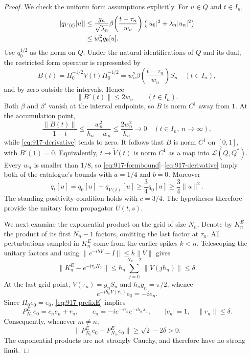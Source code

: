 \documentclass[11pt,a4paper]{article}
\theoremstyle{remark}
\begin{document}
\begin{proof}
We check the uniform form assumptions explicitly. For $u\in Q$ and
$t\in I_n$,
\begin{align}
 |q_{V(t)}[u]|
 &\le\frac{g_n}{\sqrt{\lambda_n}}
       \beta\!\left(\frac{t-\tau_n}{w_n}\right)
       \bigl(|u_0|^2+\lambda_n|u_n|^2\bigr)\notag\\
 &\le w_n^2q_0[u].\label{eq:917-formbound}
\end{align}
Use $q_0^{1/2}$ as the norm on $Q$. Under the natural identifications of
$Q$ and its dual, the restricted form operator is represented by
\[
 B(t)=H_0^{-1/2}V(t)H_0^{-1/2}
     =w_n^2\beta\!\left(\frac{t-\tau_n}{w_n}\right)S_n
       \quad(t\in I_n),
\]
and by zero outside the intervals. Hence
\begin{equation}\label{eq:917-derivative}
 \|B'(t)\|\le2w_n\qquad(t\in I_n).
\end{equation}
Both $\beta$ and $\beta'$ vanish at the interval endpoints, so $B$ is
norm $C^1$ away from $1$. At the accumulation point,
\[
 \frac{\|B(t)\|}{1-t}
 \le\frac{w_n^2}{h_n-w_n}
 \le\frac{2w_n^2}{h_n}\longrightarrow0
 \quad(t\in I_n,\ n\to\infty),
\]
while \eqref{eq:917-derivative} tends to zero. It follows that $B$ is
norm $C^1$ on $[0,1]$, with $B'(1)=0$. Equivalently,
$t\mapsto\widetilde V(t)$ is norm $C^1$ as a map into
$\mathcal L(Q,Q^*)$. Every $w_n$ is smaller than $1/8$, so
\eqref{eq:917-formbound}--\eqref{eq:917-derivative} imply both of the
catalogue's bounds with $a=1/4$ and $b=0$. Moreover
\[
 q_t[u]=q_0[u]+q_{V(t)}[u]
 \ge\frac34q_0[u]\ge\frac34\|u\|^2.
\]
The standing positivity condition holds with $c=3/4$. The hypotheses
therefore provide the unitary form propagator $U(t,s)$.

We next examine the exponential product on the grid of size $N_n$.
Denote by $K_n^E$ the product of its first $N_n-1$ factors, omitting the
last factor at $\tau_n$. All perturbations sampled in $K_n^E$ come from
the earlier spikes $k<n$. Telescoping the unitary factors and using
$\|e^{-ihV}-I\|\le h\|V\|$ gives
\begin{equation}\label{eq:917-prefixE}
 \|K_n^E-e^{-i\tau_nH_0}\|
 \le h_n\sum_{j=0}^{N_n-2}\|V(jh_n)\|\le\delta.
\end{equation}
At the last grid point, $V(\tau_n)=g_nS_n$ and $h_ng_n=\pi/2$, whence
\[
 e^{-ih_nV(\tau_n)}e_0=-ie_n.
\]
Since $H_0e_0=e_0$, \eqref{eq:917-prefixE} implies
\[
 P_{N_n}^Ee_0=c_ne_n+r_n,
 \qquad c_n=-ie^{-i\tau_n}e^{-ih_n\lambda_n},
 \qquad |c_n|=1,\quad\|r_n\|\le\delta.
\]
Consequently, whenever $m\ne n$,
\[
 \|P_{N_n}^Ee_0-P_{N_m}^Ee_0\|\ge\sqrt2-2\delta>0.
\]
The exponential products are not strongly Cauchy, and therefore have no
strong limit.


\end{proof}
\end{document}

